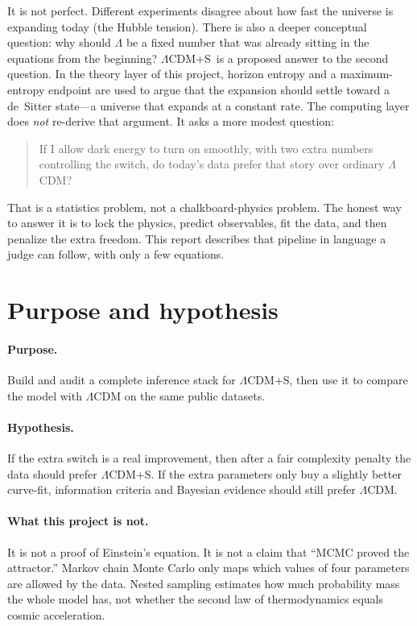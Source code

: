 \documentclass[12pt,letterpaper]{article}
\newcommand{\Lcdms}{$\Lambda$CDM+S}
\begin{document}
It is not perfect. Different experiments disagree about how fast the
universe is expanding today (the Hubble tension). There is also a
deeper conceptual question: why should $\Lambda$ be a fixed number that
was already sitting in the equations from the beginning? \Lcdms\ is a
proposed answer to the second question. In the theory layer of this
project, horizon entropy and a maximum-entropy endpoint are used to
argue that the expansion should settle toward a de~Sitter state---a
universe that expands at a constant rate. The computing layer does
\emph{not} re-derive that argument. It asks a more modest question:

\begin{quote}
If I allow dark energy to turn on smoothly, with two extra numbers
controlling the switch, do today's data prefer that story over ordinary
$\Lambda$CDM?
\end{quote}

That is a statistics problem, not a chalkboard-physics problem. The
honest way to answer it is to lock the physics, predict observables,
fit the data, and then penalize the extra freedom. This report
describes that pipeline in language a judge can follow, with only a
few equations.

\section{Purpose and hypothesis}

\paragraph{Purpose.}
Build and audit a complete inference stack for \Lcdms, then use it to
compare the model with $\Lambda$CDM on the same public datasets.

\paragraph{Hypothesis.}
If the extra switch is a real improvement, then after a fair
complexity penalty the data should prefer \Lcdms. If the extra
parameters only buy a slightly better curve-fit, information criteria
and Bayesian evidence should still prefer $\Lambda$CDM.

\paragraph{What this project is not.}
It is not a proof of Einstein's equation. It is not a claim that
``MCMC proved the attractor.'' Markov chain Monte Carlo only maps which
values of four parameters are allowed by the data. Nested sampling
estimates how much probability mass the whole model has, not whether
the second law of thermodynamics equals cosmic acceleration.
\end{document}
